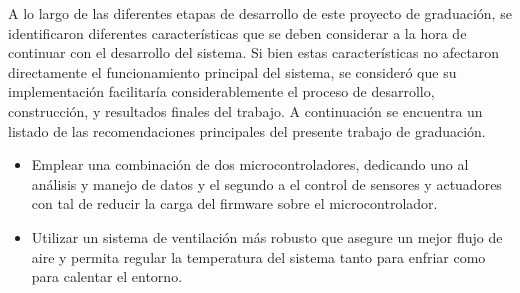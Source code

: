 A lo largo de las diferentes etapas de desarrollo de este proyecto de graduación, se identificaron diferentes características que se deben considerar a la hora de continuar con el desarrollo del sistema. Si bien estas características no afectaron directamente el funcionamiento principal del sistema, se consideró que su implementación facilitaría considerablemente el proceso de desarrollo, construcción, y resultados finales del trabajo. A continuación se encuentra un listado de las recomendaciones principales del presente trabajo de graduación.

\begin{itemize}
	\item Emplear una combinación de dos microcontroladores, dedicando uno al análisis y manejo de datos y el segundo a el control de sensores y actuadores con tal de reducir la carga del firmware sobre el microcontrolador.
	\item Utilizar un sistema de ventilación más robusto que asegure un mejor flujo de aire y permita regular la temperatura del sistema tanto para enfriar como para calentar el entorno.
\end{itemize}
